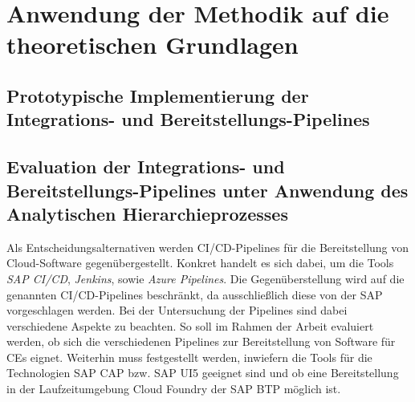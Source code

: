 \section{Anwendung der Methodik auf die theoretischen Grundlagen}

\subsection{Prototypische Implementierung der Integrations- und Bereitstellungs-Pipelines}
\subsection{Evaluation der Integrations- und Bereitstellungs-Pipelines unter Anwendung des Analytischen Hierarchieprozesses}
\label{sec:AHP}
Als Entscheidungsalternativen werden CI/CD-Pipelines für die Bereitstellung von Cloud-Software gegenübergestellt. Konkret handelt es sich dabei, um die Tools \textit{SAP CI/CD}, \textit{Jenkins}, sowie \textit{Azure Pipelines}. Die Gegenüberstellung wird auf die genannten CI/CD-Pipelines beschränkt, da ausschließlich diese von der SAP vorgeschlagen werden. Bei der Untersuchung der Pipelines sind dabei verschiedene Aspekte zu beachten. So soll im Rahmen der Arbeit evaluiert werden, ob sich die verschiedenen Pipelines zur Bereitstellung von Software für CEs eignet. Weiterhin muss festgestellt werden, inwiefern die Tools für die Technologien SAP CAP bzw. SAP UI5 geeignet sind und ob eine Bereitstellung in der Laufzeitumgebung Cloud Foundry der SAP BTP möglich ist. 

